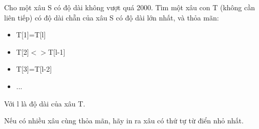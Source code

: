 Cho một xâu S có độ dài không vượt quá 2000. Tìm một xâu con T (không cần liên tiếp) có độ dài chẵn của xâu S có độ dài lớn nhất, và thỏa mãn:  
\begin{itemize}
	\item     T[1]=T[l]   
	\item     T[2]$<$$>$T[l-1]   
	\item     T[3]=T[l-2]   
	\item     ...   
\end{itemize}

   Với l là độ dài của xâu T.  

   Nếu có nhiều xâu cùng thỏa mãn, hãy in ra xâu có thứ tự từ điển nhỏ nhất.